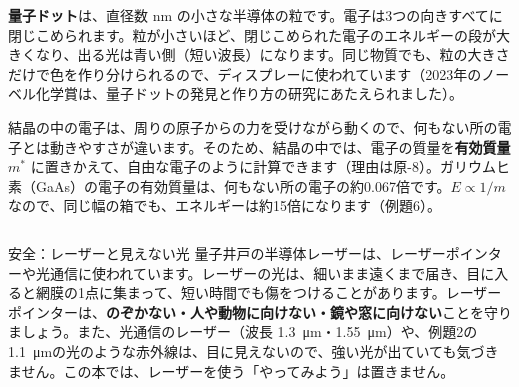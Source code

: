 \noindent \textbf{量子ドット}は、直径数 nm の小さな半導体の粒です。電子は3つの向きすべてに閉じこめられます。粒が小さいほど、閉じこめられた電子のエネルギーの段が大きくなり、出る光は青い側（短い波長）になります。同じ物質でも、粒の大きさだけで色を作り分けられるので、ディスプレーに使われています（2023年のノーベル化学賞は、量子ドットの発見と作り方の研究にあたえられました）。

\begin{bkfigure}
\label{ph:原-5:fig-dot}
\end{bkfigure}

結晶の中の電子は、周りの原子からの力を受けながら動くので、何もない所の電子とは動きやすさが違います。そのため、結晶の中では、電子の質量を\textbf{有効質量} $m^*$ に置きかえて、自由な電子のように計算できます（理由は原-8）。ガリウムヒ素（GaAs）の電子の有効質量は、何もない所の電子の約0.067倍です。$E\propto1/m$ なので、同じ幅の箱でも、エネルギーは約15倍になります（例題6）。

\begin{column}{安全：レーザーと見えない光}
量子井戸の半導体レーザーは、レーザーポインターや光通信に使われています。レーザーの光は、細いまま遠くまで届き、目に入ると網膜の1点に集まって、短い時間でも傷をつけることがあります。レーザーポインターは、\textbf{のぞかない・人や動物に向けない・鏡や窓に向けない}ことを守りましょう。また、光通信のレーザー（波長 \qty{1.3}{\micro m}・\qty{1.55}{\micro m}）や、例題2の \qty{1.1}{\micro m}の光のような赤外線は、目に見えないので、強い光が出ていても気づきません。この本では、レーザーを使う「やってみよう」は置きません。
\end{column}

